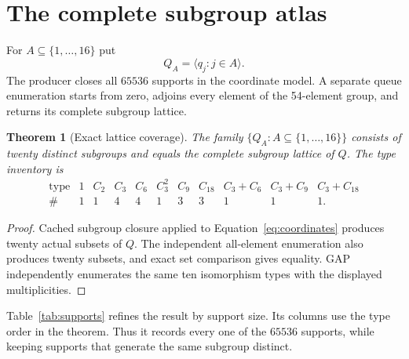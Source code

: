 \documentclass[10pt]{article}
\newtheorem{theorem}{Theorem}
\begin{document}
\section{The complete subgroup atlas}
For $A\subseteq\{1,\ldots,16\}$ put
\[
 Q_A=\langle q_j:j\in A\rangle.
\]
The producer closes all $65536$ supports in the coordinate model.  A separate
queue enumeration starts from zero, adjoins every element of the 54-element
group, and returns its complete subgroup lattice.

\begin{theorem}[Exact lattice coverage]
The family $\{Q_A:A\subseteq\{1,\ldots,16\}\}$ consists of twenty distinct
subgroups and equals the complete subgroup lattice of $Q$.  The type inventory
is
\[
\begin{array}{c|cccccccccc}
\text{type}&1&C_2&C_3&C_6&C_3^2&C_9&C_{18}&C_3{+}C_6&C_3{+}C_9&C_3{+}C_{18}\\
\hline
\#&1&1&4&4&1&3&3&1&1&1.
\end{array}
\]
\end{theorem}

\begin{proof}
Cached subgroup closure applied to Equation~\eqref{eq:coordinates} produces
twenty actual subsets of $Q$.  The independent all-element enumeration also
produces twenty subsets, and exact set comparison gives equality.  GAP
independently enumerates the same ten isomorphism types with the displayed
multiplicities.
\end{proof}

Table~\ref{tab:supports} refines the result by support size.  Its columns use
the type order in the theorem.  Thus it records every one of the $65536$
supports, while keeping supports that generate the same subgroup distinct.
\end{document}
